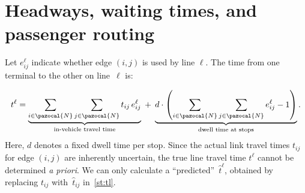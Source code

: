 \documentclass[a4paper,fleqn]{cas-sc}
\begin{document}
\section{Headways, waiting times, and passenger routing}\label{sec:graphMODEL}
  Let $e_{ij}^\ell$ indicate whether edge $(i,j)$ is used by line $\ell$. 
%
The time from one terminal to the other on line~$\ell$ is:

\begin{align}
t^\ell
=
\underbrace{\sum_{i \in \pazocal{N}} \sum_{j \in \pazocal{N}} t_{ij} \, e_{ij}^\ell}_{\text{in-vehicle travel time}}
\;+\;
\underbrace{d \cdot \left(
\sum_{i \in \pazocal{N}} \sum_{j \in \pazocal{N}} e_{ij}^\ell - 1
\right)}_{\text{dwell time at stops}} .
\label{st:tl}
\end{align}
%
%
Here, $d$ denotes a fixed dwell time per stop.  Since the actual link travel times $t_{ij}$ for edge $(i, j)$ are inherently uncertain, the true line travel time $t^\ell$ cannot be determined \textit{a priori}. We can only calculate a ``predicted''~$\hat t^\ell$, obtained by replacing $t_{ij}$ with~$\hat t_{ij}$ in~\eqref{st:tl}.
\end{document}
